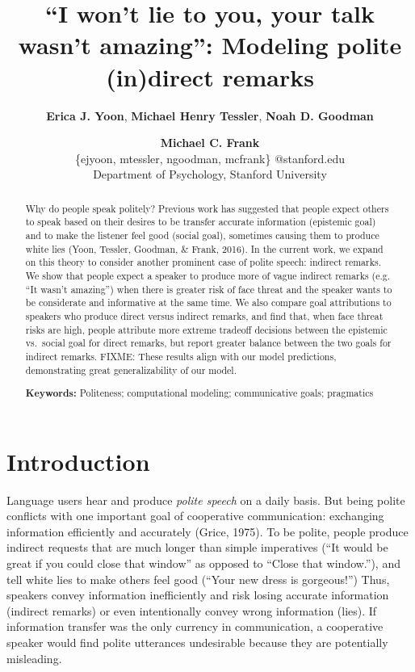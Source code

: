 \documentclass[10pt, letterpaper]{article}
\title{``I won't lie to you, your talk wasn't amazing'': Modeling polite
(in)direct remarks}
\author{{\large \bf Erica J. Yoon}, {\large \bf Michael Henry Tessler}, {\large \bf Noah D. Goodman} \and {\large \bf Michael C. Frank}  \\
        \{ejyoon, mtessler, ngoodman, mcfrank\} @stanford.edu \\ 
        Department of Psychology, Stanford University}
\begin{document}
\maketitle

\begin{abstract}
Why do people speak politely? Previous work has suggested that people
expect others to speak based on their desires to be transfer accurate
information (epistemic goal) and to make the listener feel good (social
goal), sometimes causing them to produce white lies (Yoon, Tessler,
Goodman, \& Frank, 2016). In the current work, we expand on this theory
to consider another prominent case of polite speech: indirect remarks.
We show that people expect a speaker to produce more of vague indirect
remarks (e.g. ``It wasn't amazing'') when there is greater risk of face
threat and the speaker wants to be considerate and informative at the
same time. We also compare goal attributions to speakers who produce
direct versus indirect remarks, and find that, when face threat risks
are high, people attribute more extreme tradeoff decisions between the
epistemic vs.~social goal for direct remarks, but report greater balance
between the two goals for indirect remarks. FIXME: These results align
with our model predictions, demonstrating great generalizability of our
model.

\textbf{Keywords:}
Politeness; computational modeling; communicative goals; pragmatics
\end{abstract}

\section{Introduction}\label{introduction}

Language users hear and produce \emph{polite speech} on a daily basis.
But being polite conflicts with one important goal of cooperative
communication: exchanging information efficiently and accurately (Grice,
1975). To be polite, people produce indirect requests that are much
longer than simple imperatives (``It would be great if you could close
that window'' as opposed to ``Close that window.''), and tell white lies
to make others feel good (``Your new dress is gorgeous!'') Thus,
speakers convey information inefficiently and risk losing accurate
information (indirect remarks) or even intentionally convey wrong
information (lies). If information transfer was the only currency in
communication, a cooperative speaker would find polite utterances
undesirable because they are potentially misleading.
\end{document}
